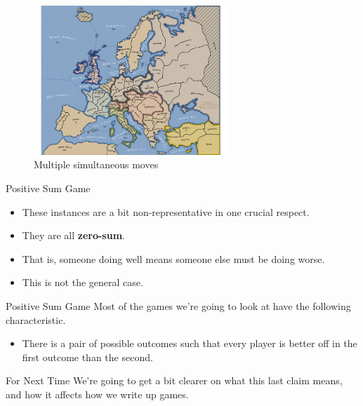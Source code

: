 \documentclass[
  ignorenonframetext,
]{beamer}
\providecommand{\tightlist}{%
  \setlength{\itemsep}{0pt}\setlength{\parskip}{0pt}}
\begin{document}
\begin{frame}
\begin{figure}
\centering
\includegraphics[width=0.65\textwidth,height=0.65\textheight]{images/diplomacy.pdf}
\caption{Multiple simultaneous moves}
\end{figure}
\end{frame}

\begin{frame}{Positive Sum Game}
\protect\hypertarget{positive-sum-game}{}
\begin{itemize}
\tightlist
\item
  These instances are a bit non-representative in one crucial respect.
\item
  They are all \textbf{zero-sum}.
\item
  That is, someone doing well means someone else must be doing worse.
\item
  This is not the general case.
\end{itemize}
\end{frame}

\begin{frame}{Positive Sum Game}
\protect\hypertarget{positive-sum-game-1}{}
Most of the games we're going to look at have the following
characteristic.

\begin{itemize}
\tightlist
\item
  There is a pair of possible outcomes such that every player is better
  off in the first outcome than the second.
\end{itemize}
\end{frame}

\begin{frame}{For Next Time}
\protect\hypertarget{for-next-time-1}{}
We're going to get a bit clearer on what this last claim means, and how
it affects how we write up games.
\end{frame}
\end{document}
